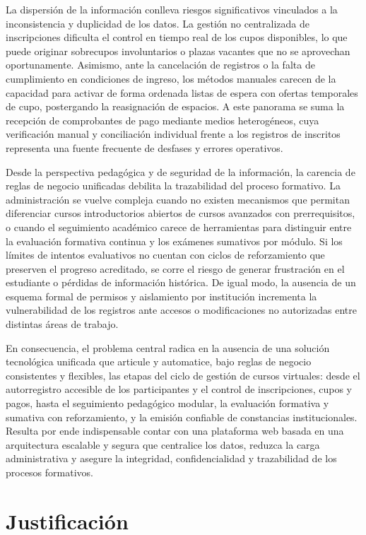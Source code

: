 La dispersión de la información conlleva riesgos significativos vinculados a la inconsistencia y duplicidad de los datos. La gestión no centralizada de inscripciones dificulta el control en tiempo real de los cupos disponibles, lo que puede originar sobrecupos involuntarios o plazas vacantes que no se aprovechan oportunamente. Asimismo, ante la cancelación de registros o la falta de cumplimiento en condiciones de ingreso, los métodos manuales carecen de la capacidad para activar de forma ordenada listas de espera con ofertas temporales de cupo, postergando la reasignación de espacios. A este panorama se suma la recepción de comprobantes de pago mediante medios heterogéneos, cuya verificación manual y conciliación individual frente a los registros de inscritos representa una fuente frecuente de desfases y errores operativos.

Desde la perspectiva pedagógica y de seguridad de la información, la carencia de reglas de negocio unificadas debilita la trazabilidad del proceso formativo. La administración se vuelve compleja cuando no existen mecanismos que permitan diferenciar cursos introductorios abiertos de cursos avanzados con prerrequisitos, o cuando el seguimiento académico carece de herramientas para distinguir entre la evaluación formativa continua y los exámenes sumativos por módulo. Si los límites de intentos evaluativos no cuentan con ciclos de reforzamiento que preserven el progreso acreditado, se corre el riesgo de generar frustración en el estudiante o pérdidas de información histórica. De igual modo, la ausencia de un esquema formal de permisos y aislamiento por institución incrementa la vulnerabilidad de los registros ante accesos o modificaciones no autorizadas entre distintas áreas de trabajo.

En consecuencia, el problema central radica en la ausencia de una solución tecnológica unificada que articule y automatice, bajo reglas de negocio consistentes y flexibles, las etapas del ciclo de gestión de cursos virtuales: desde el autorregistro accesible de los participantes y el control de inscripciones, cupos y pagos, hasta el seguimiento pedagógico modular, la evaluación formativa y sumativa con reforzamiento, y la emisión confiable de constancias institucionales. Resulta por ende indispensable contar con una plataforma web basada en una arquitectura escalable y segura que centralice los datos, reduzca la carga administrativa y asegure la integridad, confidencialidad y trazabilidad de los procesos formativos.

\section{Justificación}

